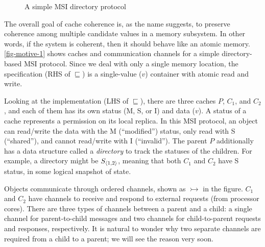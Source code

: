 \documentclass[sigplan,10pt,review,anonymous,screen]{acmart}\settopmatter{printfolios=true,printccs=false,printacmref=false}
\begin{document}

\begin{figure}[h]
  \caption{A simple MSI directory protocol}
  \vspace{-5pt}
  \label{fig-motive-1}
\end{figure}

The overall goal of cache coherence is, as the name suggests, to preserve coherence among multiple candidate values in a memory subsystem.
In other words, if the system is coherent, then it should behave like an atomic memory.
\autoref{fig-motive-1} shows caches and communication channels for a simple directory-based MSI protocol.
Since we deal with only a single memory location, the specification (RHS of $\sqsubseteq$) is a single-value ($v$) container with atomic read and write.

Looking at the implementation (LHS of $\sqsubseteq$), there are three caches $P$, $C_1$, and $C_2$, and each of them has its own status (M, S, or I) and data ($v$).
A status of a cache represents a permission on its local replica.
In this MSI protocol, an object can read/write the data with the M (``modified'') status, only read with S (``shared''), and cannot read/write with I (``invalid'').
The parent $P$ additionally has a data structure called a \emph{directory} to track the statuses of the children.
For example, a directory might be $S_{\langle 1, 2 \rangle}$, meaning that both $C_1$ and $C_2$ have S status, in some logical snapshot of state.

Objects communicate through ordered channels, shown as $\rightarrowtail$ in the figure.
$C_1$ and $C_2$ have channels to receive and respond to external requests (from processor cores).
There are three types of channels between a parent and a child: a single channel for parent-to-child messages and two channels for child-to-parent requests and responses, respectively.
It is natural to wonder why two separate channels are required from a child to a parent; we will see the reason very soon.
\end{document}

